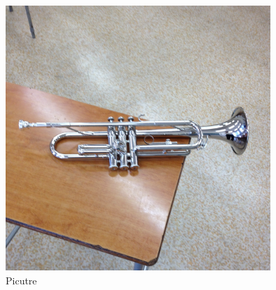 \documentclass[dvipdfmx,12pt]{ujarticle}
\begin{document}
\begin{figure}[ht]
    \centering
    \includegraphics[width=10cm]{trp.png}
    \caption{Picutre}
    \label{SampleFigure2}
\end{figure}
\end{document}
